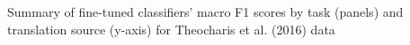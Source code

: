 Summary of fine-tuned classifiers' macro F1 scores by task (panels) and translation source (y-axis) for Theocharis et al. (2016) data \label{fig:f1_scores_theocharis_et_al_2016}

